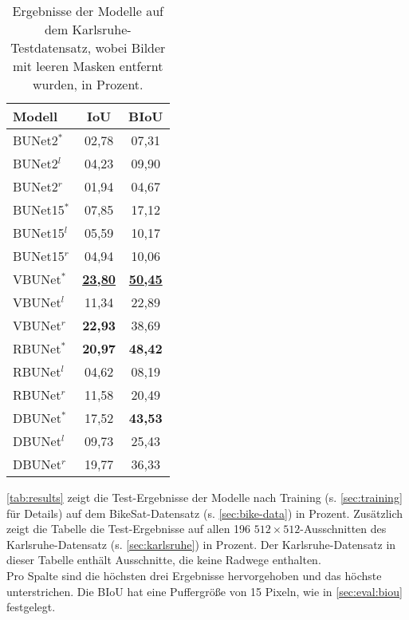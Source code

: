 \begin{table}[ht]
	\centering
	\begin{tabular}{l|cc}
		Modell & \ac{IoU} & \ac{BIoU}  \\
		\midrule
        BUNet2$^*$ & 02,78 & 07,31  \\ 
        BUNet2$^l$ & 04,23 & 09,90  \\ 
        BUNet2$^r$ & 01,94 & 04,67  \\ 
		\midrule

        BUNet15$^*$ & 07,85 & 17,12  \\ 
        BUNet15$^l$ & 05,59 & 10,17  \\ 
        BUNet15$^r$ & 04,94 & 10,06  \\ 
		\midrule

        VBUNet$^*$ & \underline{\textbf{23,80}} & \underline{\textbf{50,45}} \\ 
        VBUNet$^l$ & 11,34 & 22,89 \\ 
        VBUNet$^r$ & \textbf{22,93} & 38,69 \\ 
		\midrule

        RBUNet$^*$ & \textbf{20,97} & \textbf{48,42} \\ 
        RBUNet$^l$ & 04,62 & 08,19 \\ 
        RBUNet$^r$ & 11,58 & 20,49 \\ 
		\midrule

        DBUNet$^*$ & 17,52 & \textbf{43,53} \\ 
        DBUNet$^l$ & 09,73 & 25,43 \\ 
        DBUNet$^r$ & 19,77 & 36,33 \\ 
        
	\end{tabular}
	\caption{Ergebnisse der Modelle auf dem Karlsruhe-Testdatensatz, wobei Bilder mit leeren Masken entfernt wurden, 
    in Prozent.}
	\label{tab:results-ka-small}
\end{table}

\autoref{tab:results} zeigt die Test-Ergebnisse der Modelle nach Training (s. \autoref{sec:training} für Details) auf dem BikeSat-Datensatz 
(s. \autoref{sec:bike-data}) in Prozent. Zusätzlich zeigt die Tabelle die Test-Ergebnisse auf allen 196 $512{\times}512$-Ausschnitten 
des Karlsruhe-Datensatz (s. \autoref{sec:karlsruhe}) in Prozent. Der Karlsruhe-Datensatz in dieser Tabelle
enthält Ausschnitte, die keine Radwege enthalten. \\ 
Pro Spalte sind die höchsten drei Ergebnisse hervorgehoben und das höchste unterstrichen.
Die \ac{BIoU} hat eine Puffergröße von 15 Pixeln, wie in \autoref{sec:eval:biou} festgelegt.


